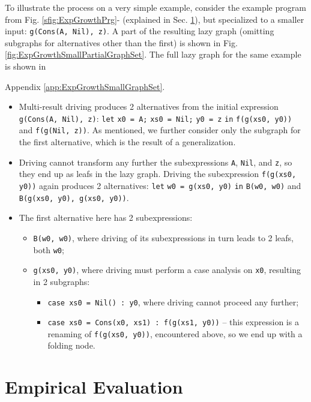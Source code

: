 \documentclass[submission,copyright,creativecommons]{eptcs}
\newif\ifVptVer
\begin{document}
To illustrate the process on a very simple example, consider the example program from 
Fig. \ref{sfig:ExpGrowthPrg}- (explained in Sec. \ref{sec:EmpEval}), 
but specialized to a smaller input: \verb|g(Cons(A, Nil), z)|.
A part of the resulting lazy graph (omitting subgraphs for alternatives other than the first)
is shown in Fig. \ref{fig:ExpGrowthSmallPartialGraphSet}.
The full lazy graph for the same example is shown in 
\ifVptVer
the extended version of this article \cite{krustev2020controlling}.
\else
Appendix \ref{app:ExpGrowthSmallGraphSet}.
\fi
\begin{itemize}
  \item Multi-result driving produces 2 alternatives from the initial expression \verb|g(Cons(A, Nil), z)|:
    \verb|let| \verb|x0 = A;| \verb|xs0 = Nil;| \verb|y0 = z| \verb|in| \verb|f(g(xs0, y0))| and \verb|f(g(Nil, z))|.
    As mentioned, we further consider only the subgraph for the first alternative, which
    is the result of a generalization.
  \item Driving cannot transform any further the subexpressions \verb|A|, \verb|Nil|, and \verb|z|, 
    so they end up as leafs in the lazy graph.
    Driving the subexpression \verb|f(g(xs0, y0))| again produces 2 alternatives:
    \verb|let| \verb|w0 = g(xs0, y0)| \verb|in| \verb|B(w0, w0)| and \verb|B(g(xs0, y0), g(xs0, y0))|.
  \item The first alternative here has 2 subexpressions: 
    \begin{itemize}
      \item \verb|B(w0, w0)|, where driving of its subexpressions in turn leads to 2 leafs, both \verb|w0|;
      \item \verb|g(xs0, y0)|, where driving must perform a case analysis on \verb|x0|, resulting in 2 subgraphs:
      \begin{itemize}
        \item \verb|case xs0 = Nil() : y0|, where driving cannot proceed any further;
        \item \verb|case xs0 = Cons(x0, xs1) : f(g(xs1, y0))| -- this expression is a renaming of
          \verb|f(g(xs0, y0))|, encountered above, so we end up with a folding node.
      \end{itemize}
    \end{itemize}
\end{itemize}

\section{Empirical Evaluation}\label{sec:EmpEval}
\end{document}
